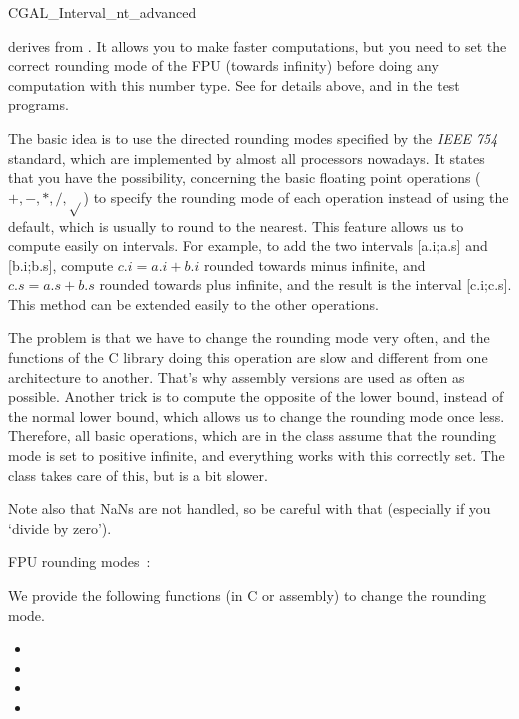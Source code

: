 \begin{ccAdvanced}

\begin{ccClass} {CGAL_Interval_nt_advanced}
\label{interval-adv}

 derives from .
It allows you to make faster computations, but you need to set the correct
rounding mode of the FPU (towards infinity) before doing any computation with
this number type.  
See for details above, and in the test programs.


\ccImplementation

The basic idea is to use the directed rounding modes specified by the 
{\it IEEE 754} standard, which are implemented by almost all processors 
nowadays.
It states that you have the possibility, concerning the basic floating point
operations ($+,-,*,/,\sqrt{}$) to specify the rounding mode of each operation
instead of using the default, which is usually to round to the nearest.
This feature allows us to compute easily on intervals.  For example, to add
the two intervals [a.i;a.s] and [b.i;b.s], compute $c.i=a.i+b.i$ rounded
towards minus infinite, and $c.s=a.s+b.s$ rounded towards plus infinite, and
the result is the interval [c.i;c.s].  This method can be extended easily to
the other operations.

The problem is that we have to change the rounding mode very often, and the
functions of the C library doing this operation are slow and different from
one architecture to another.  That's why assembly versions are used as often
as possible.
Another trick is to compute the opposite of the lower bound, instead of the
normal lower bound, which allows us to change the rounding mode once less.
Therefore, all basic operations, which are in the class 
 assume that the rounding mode is set to 
positive infinite, and everything works with this correctly set.  
The class  takes care of this, but is a bit slower.

Note also that NaNs are not handled, so be careful with that
(especially if you `divide by zero').

FPU rounding modes~:

We provide the following functions (in C or assembly) to change the 
rounding mode.
\begin{itemize}
\item {}
\item {}
\item {}
\item {}
\end{itemize}


\end{ccClass}
\end{ccAdvanced}

